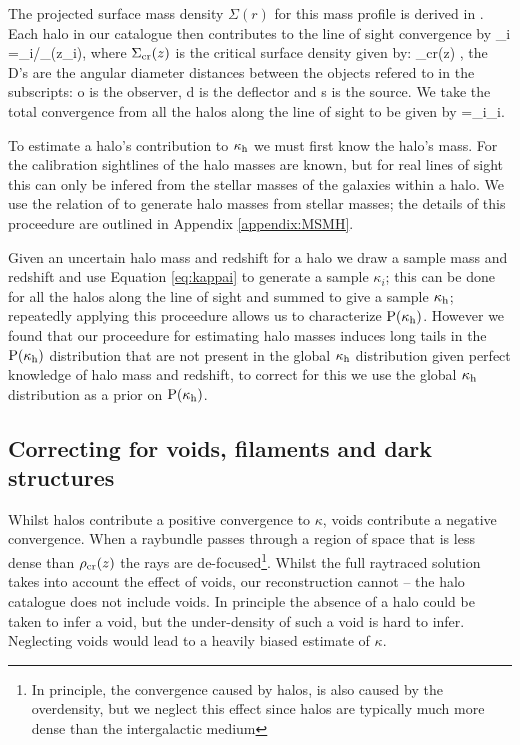 \documentclass[useAMS,usenatbib]{mn2e}
\begin{document}
The projected surface mass density $\Sigma(r)$ for this mass profile is derived in \citet{BMO}. Each halo in our catalogue then contributes to the line of sight convergence by
\be
\label{eq:kappai}
\kappa_i =\Sigma_{i}/\Sigma_{}(z_i),
\ee
 where $\Sigma_{\rm cr}(z)$ is the critical surface density given by:
\be \label{eq:sigcrit} 
\Sigma_{\rm cr}(z) \equiv {},
\ee
 the D's are the angular diameter distances between the objects refered to in the subscripts: o is the observer, d is the deflector and s is the source. We take the total convergence from all the halos along the line of sight to be given by
\be \label{eq:kappasummu}
\kappah=\sum_{i}\kappa_i.
\ee

To estimate a halo's contribution to $\kappa_{\rm h}$ we must first know the halo's mass.
For the calibration sightlines of the \MS halo masses are known, but for 
real lines of sight this can only be infered from the stellar masses of the
galaxies within a halo. We use the relation of \citet{BehrooziEtal2009} to generate 
halo masses from stellar masses; the details of this proceedure are outlined in
Appendix \ref{appendix:MSMH}.

Given an uncertain halo mass and redshift for a halo we draw a sample mass and redshift and use Equation \ref{eq:kappai} to generate a sample $\kappa_i$; this can be done for all the halos along the line of sight and summed to give a sample $\kappa_{\rm h}$; repeatedly applying this proceedure allows us to characterize ${\rm P}(\kappa_{\rm h})$. However we found that our proceedure for estimating halo masses induces long tails in the ${\rm P}(\kappa_{\rm h})$ distribution that are not present in the global $\kappa_{\rm h}$ distribution given perfect knowledge of halo mass and redshift, to correct for this we use the global $\kappa_{\rm h}$ distribution as a prior on ${\rm P}(\kappa_{\rm h})$.


\subsection{Correcting for voids, filaments and dark structures}
\label{subsec:voids}

Whilst halos contribute a positive convergence to $\kappa$, voids contribute
a negative convergence. When a raybundle passes through a  region of space
that is less dense than $\rho_{\rm cr}(z)$ the rays are de-focused\footnote{In
principle, the convergence caused by halos, is also caused by the overdensity,
but we neglect this effect since halos are typically much more dense than the
intergalactic medium}. Whilst the  full raytraced solution takes into account
the effect of voids, our reconstruction cannot -- the halo catalogue does not
include voids. In principle the absence of a halo could be taken to infer a
void, but the under-density of such a void is hard to infer. Neglecting voids
would lead to a heavily biased estimate of $\kappa$. 
\end{document}
